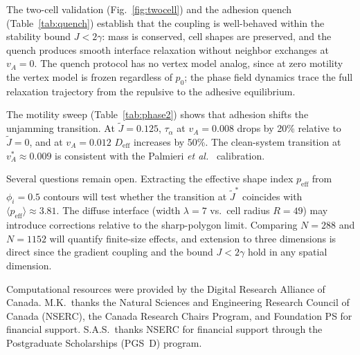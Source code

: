 \documentclass[aps,pre,twocolumn,superscriptaddress,longbibliography,floatfix]{revtex4-2}
\newcommand{\vA}{v_{\!A}}                  %
\newcommand{\peff}{p_{\mathrm{eff}}}       %
\newcommand{\Jt}{\tilde{J}}               %
\newcommand{\phii}{\phi_i}                 %
\begin{document}
The two-cell validation (Fig.~\ref{fig:twocell}) and the adhesion
quench (Table~\ref{tab:quench}) establish that the coupling is
well-behaved within the stability bound $J < 2\gamma$: mass is
conserved, cell shapes are preserved, and the quench produces
smooth interface relaxation without neighbor exchanges at
$\vA = 0$.  The quench protocol has no vertex model analog, since
at zero motility the vertex model is frozen regardless of $p_0$;
the phase field dynamics trace the full relaxation trajectory
from the repulsive to the adhesive equilibrium.

The motility sweep (Table~\ref{tab:phase2}) shows that adhesion
shifts the unjamming transition.  At $\Jt = 0.125$,
$\tau_\alpha$ at $\vA = 0.008$ drops by 20\% relative to $\Jt = 0$,
and at $\vA = 0.012$ $D_{\mathrm{eff}}$ increases by 50\%.
The clean-system transition at $v_A^* \approx 0.009$ is consistent
with the Palmieri \textit{et al.}~\cite{Palmieri2015} calibration.

Several questions remain open.  Extracting the effective shape
index $\peff$ from $\phii = 0.5$ contours will test whether the
transition at $\Jt^*$ coincides with
$\langle\peff\rangle \approx 3.81$.  The diffuse interface
(width $\lambda = 7$ vs.\ cell radius $R = 49$) may introduce
corrections relative to the sharp-polygon limit.  Comparing
$N = 288$ and $N = 1152$ will quantify finite-size effects, and
extension to three dimensions is direct since the gradient coupling
and the bound $J < 2\gamma$ hold in any spatial dimension.


\begin{acknowledgments}
Computational resources were provided by the Digital Research Alliance
of Canada.
M.K.\ thanks the Natural Sciences and Engineering Research Council of
Canada (NSERC), the Canada Research Chairs Program, and Foundation PS
for financial support.
S.A.S.\ thanks NSERC for financial support through the Postgraduate
Scholarships (PGS~D) program.
\end{acknowledgments}
\end{document}
